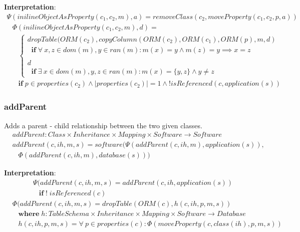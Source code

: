 \documentclass[10pt]{article}
\begin{document}
\noindent \textbf{Interpretation}:
\begin{align}
\Psi(inilineObjectAsProperty(c_1, c_2, m), a) =  removeClass(c_2, moveProperty(c_1, c_2, p, a))  
\end{align}
\begin{align}
& \Phi(inilineObjectAsProperty(c_1, c_2, m), d) = \nonumber \\ 
& \;\;\; \begin{cases}
 dropTable(ORM(c_2), copyColumn(ORM(c_2), ORM(c_1), ORM(p), m, d) \\
\;\; \mathbf{if} \;  \forall \: x, z \in dom(m), y \in ran(m) : m(x) = y \land  
 m(z) = y \implies x = z 
 \\\\
 d \\
 \;\; \mathbf{if} \; \exists \: x \in dom(m), y, z \in ran(m) : m(x) = \{y, z\} \land y \neq z
 \end{cases} \nonumber \\
& \;\;\; \mathbf{if} \; p \in properties(c_2) \land |properties(c_2)| = 1 \land ! isReferenced(c,application(s)) 
\end{align}


\subsubsection{addParent}
Adds a parent - child relationship between the two given classes.
\begin{align}
& addParent: Class \times Inheritance \times Mapping \times Software \rightarrow Software \nonumber \\
& addParent(c, ih, m, s) = software(\Psi(addParent(c, ih, m), application(s)), \nonumber \\
& \;\;\;  \Phi(addParent(c, ih, m), database(s)))
\end{align}

\noindent \textbf{Interpretation}:
\begin{align}
& \Psi(addParent(c, ih, m, s) = addParent(c, ih, application(s)) \nonumber \\
& \;\;\; \mathbf{if} \; !\; isReferenced(c)
\end{align}
\begin{align}
& \Phi(addParent(c, ih, m, s) = dropTable(ORM(c), h(c, ih, p, m, s)) \nonumber \\
& \;\;\; \mathbf{where} \; h : TableSchema \times Inheritance \times Mapping \times Software \rightarrow Database  \nonumber \\
& \;\;\; h(c, ih, p, m, s) = \forall \: p \in properties(c) : \Phi(moveProperty(c, class(ih), p, m, s))
\end{align}
\end{document}
